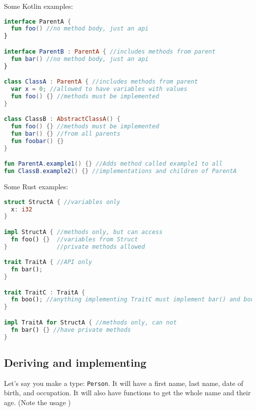 \documentclass[a4paper,11pt]{article}
\begin{document}
\newpage
Some Kotlin examples:
\begin{lstlisting}[language=Kotlin,frame=single]
interface ParentA {
  fun foo() //no method body, just an api
}

interface ParentB : ParentA { //includes methods from parent
  fun bar() //no method body, just an api
}

class ClassA : ParentA { //includes methods from parent
  var x = 0; //allowed to have variables with values
  fun foo() {} //methods must be implemented
}

class ClassB : AbstractClassA() {
  fun foo() {} //methods must be implemented
  fun bar() {} //from all parents
  fun foobar() {}
}

fun ParentA.example1() {} //Adds method called example1 to all
fun ClassB.example2() {} //implementations and children of ParentA
\end{lstlisting}

Some Rust examples:
\begin{lstlisting}[language=Rust,frame=single]
struct StructA { //variables only
  x: i32
}

impl StructA { //methods only, but can access
  fn foo() {}  //variables from Struct 
}              //private methods allowed

trait TraitA { //API only
  fn bar();
}

trait TraitC : TraitA { 
  fn boo(); //anything implementing TraitC must implement bar() and boo()
}

impl TraitA for StructA { //methods only, can not 
  fn bar() {} //have private methods
}
\end{lstlisting}
\newpage
\subsection{Deriving and implementing}
Let's say you make a type: \lstinline{Person}. It will have a first name, last name, date of birth, and occupation. It will also have functions to get the whole name and their age. (Note the usage )
\end{document}
